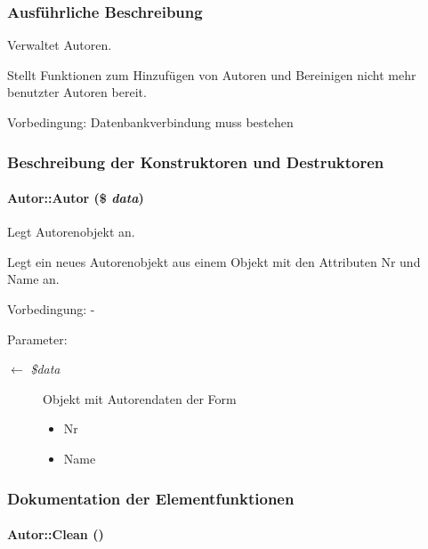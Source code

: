\subsubsection{Ausf\"{u}hrliche Beschreibung}
Verwaltet Autoren. 

Stellt Funktionen zum Hinzufügen von Autoren und Bereinigen nicht mehr benutzter Autoren bereit. \begin{Desc}
\item[Vorbedingung:]Datenbankverbindung muss bestehen \end{Desc}




\subsubsection{Beschreibung der Konstruktoren und Destruktoren}
\hypertarget{classAutor_2302710dd8970853f5d49c62d4586e8f}{
\paragraph[Autor]{\setlength{\rightskip}{0pt plus 5cm}Autor::Autor (\$ {\em data})}\hfill}
\label{classAutor_2302710dd8970853f5d49c62d4586e8f}


Legt Autorenobjekt an. 

Legt ein neues Autorenobjekt aus einem Objekt mit den Attributen Nr und Name an. \begin{Desc}
\item[Vorbedingung:]- \end{Desc}
\begin{Desc}
\item[Parameter:]
\begin{description}
\item[\mbox{$\leftarrow$} {\em \$data}]Objekt mit Autorendaten der Form\begin{itemize}
\item Nr\item Name \end{itemize}
\end{description}
\end{Desc}


\subsubsection{Dokumentation der Elementfunktionen}
\hypertarget{classAutor_77b27af7e471abe5a404fc92c7319921}{
\paragraph[Clean]{\setlength{\rightskip}{0pt plus 5cm}Autor::Clean ()}\hfill}
\label{classAutor_77b27af7e471abe5a404fc92c7319921}


